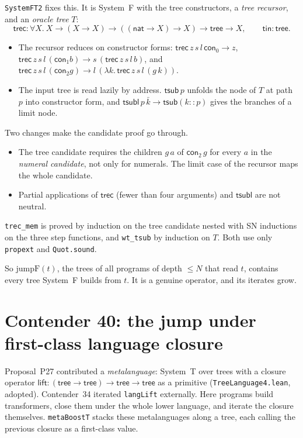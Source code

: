 \documentclass[11pt]{article}
\theoremstyle{definition}
\theoremstyle{remark}
\newcommand{\lean}[1]{\texttt{#1}}
\begin{document}
\lean{SystemFT2} fixes this. It is System~F with the tree constructors, a
\emph{tree recursor}, and an \emph{oracle tree} $T$:
\[
\mathsf{trec}:\forall X.\ X\to(X\to X)\to((\mathsf{nat}\to X)\to X)\to\mathsf{tree}\to X,
\qquad \mathsf{tin}:\mathsf{tree}.
\]
\begin{itemize}[leftmargin=*]
\item The recursor reduces on constructor forms:
  $\mathsf{trec}\,z\,s\,l\,\mathsf{con}_0\to z$,
  $\mathsf{trec}\,z\,s\,l\,(\mathsf{con}_1 b)\to s\,(\mathsf{trec}\,z\,s\,l\,b)$, and
  $\mathsf{trec}\,z\,s\,l\,(\mathsf{con}_2 g)\to l\,(\lambda k.\,\mathsf{trec}\,z\,s\,l\,(g\,k))$.
\item The input tree is read lazily by address. $\mathsf{tsub}\,p$ unfolds
  the node of $T$ at path $p$ into constructor form, and
  $\mathsf{tsubl}\,p\,\bar k\to\mathsf{tsub}(k{::}p)$ gives the branches of a
  limit node.
\end{itemize}
Two changes make the candidate proof go through.
\begin{itemize}[leftmargin=*]
\item The tree candidate requires the children $g\,a$ of $\mathsf{con}_2\,g$
  for every $a$ in the \emph{numeral candidate}, not only for numerals. The
  limit case of the recursor maps the whole candidate.
\item Partial applications of $\mathsf{trec}$ (fewer than four arguments) and
  $\mathsf{tsubl}$ are not neutral.
\end{itemize}
\lean{trec\_mem} is proved by induction on the tree candidate nested with SN
inductions on the three step functions, and \lean{wt\_tsub} by induction on
$T$. Both use only \lean{propext} and \lean{Quot.sound}.

So $\mathrm{jumpF}(t)$, the trees of all programs of depth $\le N$ that read
$t$, contains every tree System~F builds from $t$. It is a genuine
operator, and its iterates grow.

\section{Contender 40: the jump under first-class language closure}

Proposal~P27 contributed a \emph{metalanguage}: System~T over trees with a
closure operator $\mathsf{lift}:(\mathsf{tree}\to\mathsf{tree})\to\mathsf{tree}\to\mathsf{tree}$
as a primitive (\lean{TreeLanguage4.lean}, adopted). Contender~34 iterated
\lean{langLift} externally. Here programs build transformers, close them
under the whole lower language, and iterate the closure themselves.
\lean{metaBoostT} stacks these metalanguages along a tree, each calling the
previous closure as a first-class value.
\end{document}
